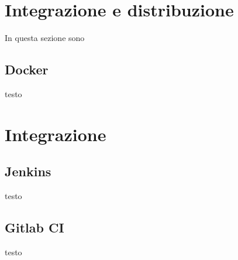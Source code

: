 \section{Integrazione e distribuzione}
In questa sezione sono
\subsection{Docker}
testo
\section{Integrazione}
\subsection{Jenkins}
testo
\subsection{Gitlab CI}
testo
